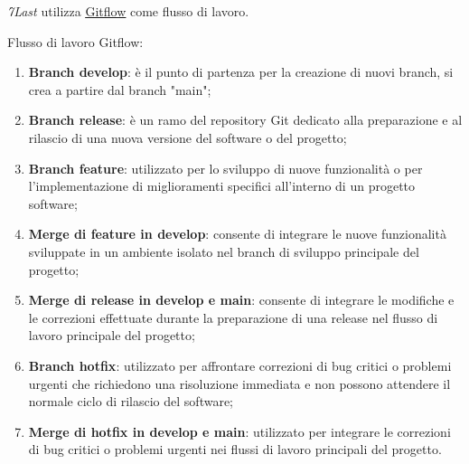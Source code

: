 \textit{7Last} utilizza \href{https://www.atlassian.com/it/git/tutorials/comparing-workflows/gitflow-workflow}{\underline{{Gitflow}}} come flusso di lavoro.
\begin{flushleft}
	Flusso di lavoro Gitflow:
\end{flushleft}
\begin{enumerate}
	\item \textbf{Branch develop}: è il punto di partenza per la creazione di nuovi branch, si crea a partire dal branch "main";
	\item \textbf{Branch release}: è un ramo del repository Git dedicato alla preparazione e al rilascio di una nuova versione del software o del progetto;
	\item \textbf{Branch feature}: utilizzato per lo sviluppo di nuove funzionalità o per l'implementazione di miglioramenti specifici all'interno di un progetto software;
	\item \textbf{Merge di feature in develop}: consente di integrare le nuove funzionalità sviluppate in un ambiente isolato nel branch di sviluppo principale del progetto;
	\item \textbf{Merge di release in develop e main}: consente di integrare le modifiche e le correzioni effettuate durante la preparazione di una release nel flusso di lavoro principale del progetto;
	\item \textbf{Branch hotfix}: utilizzato per affrontare correzioni di bug critici o problemi urgenti che richiedono una risoluzione immediata e non possono attendere il normale ciclo di rilascio del software;
	\item \textbf{Merge di hotfix in develop e main}: utilizzato per integrare le correzioni di bug critici o problemi urgenti nei flussi di lavoro principali del progetto.
\end{enumerate}

